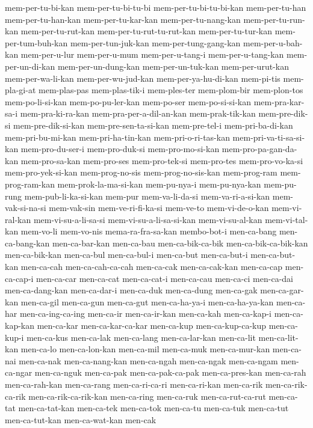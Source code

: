 {mem-per-tu-bi-kan mem-per-tu-bi-tu-bi mem-per-tu-bi-tu-bi-kan
mem-per-tu-han mem-per-tu-han-kan mem-per-tu-kar-kan mem-per-tu-nang-kan
mem-per-tu-run-kan mem-per-tu-rut-kan mem-per-tu-rut-tu-rut-kan
mem-per-tu-tur-kan mem-per-tum-buh-kan mem-per-tun-juk-kan
mem-per-tung-gang-kan mem-per-u-bah-kan mem-per-u-lur mem-per-u-mum
mem-per-u-tang-i mem-per-u-tang-kan mem-per-un-di-kan mem-per-un-dung-kan
mem-per-un-tuk-kan mem-per-urut-kan mem-per-wa-li-kan mem-per-wu-jud-kan
mem-per-ya-hu-di-kan mem-pi-tis mem-pla-gi-at mem-plas-pas mem-plas-tik-i
mem-ples-ter mem-plom-bir mem-plon-tos mem-po-li-si-kan mem-po-pu-ler-kan
mem-po-ser mem-po-si-si-kan mem-pra-kar-sa-i mem-pra-ki-ra-kan
mem-pra-per-a-dil-an-kan mem-prak-tik-kan mem-pre-dik-si
mem-pre-dik-si-kan mem-pre-sen-ta-si-kan mem-pre-tel-i mem-pri-ba-di-kan
mem-pri-bu-mi-kan mem-pri-ha-tin-kan mem-pri-o-ri-tas-kan
mem-pri-va-ti-sa-si-kan mem-pro-du-ser-i mem-pro-duk-si mem-pro-mo-si-kan
mem-pro-pa-gan-da-kan mem-pro-sa-kan mem-pro-ses mem-pro-tek-si
mem-pro-tes mem-pro-vo-ka-si mem-pro-yek-si-kan mem-prog-no-sis
mem-prog-no-sis-kan mem-prog-ram mem-prog-ram-kan mem-prok-la-ma-si-kan
mem-pu-nya-i mem-pu-nya-kan mem-pu-rung mem-pub-li-ka-si-kan mem-pur
mem-va-li-da-si mem-va-ri-a-si-kan mem-vak-si-na-si mem-vak-sin
mem-ve-ri-fi-ka-si mem-ve-to mem-vi-de-o-kan mem-vi-ral-kan
mem-vi-su-a-li-sa-si mem-vi-su-a-li-sa-si-kan mem-vi-su-al-kan
mem-vi-tal-kan mem-vo-li mem-vo-nis mema-ra-fra-sa-kan membo-bot-i
men-ca-bang men-ca-bang-kan men-ca-bar-kan men-ca-bau men-ca-bik-ca-bik
men-ca-bik-ca-bik-kan men-ca-bik-kan men-ca-bul men-ca-bul-i men-ca-but
men-ca-but-i men-ca-but-kan men-ca-cah men-ca-cah-ca-cah men-ca-cak
men-ca-cak-kan men-ca-cap men-ca-cap-i men-ca-car men-ca-cat men-ca-cat-i
men-ca-cau men-ca-ci men-ca-dai men-ca-dang-kan men-ca-dar-i men-ca-duk
men-ca-dung men-ca-gak men-ca-gar-kan men-ca-gil men-ca-gun men-ca-gut
men-ca-ha-ya-i men-ca-ha-ya-kan men-ca-har men-ca-ing-ca-ing men-ca-ir
men-ca-ir-kan men-ca-kah men-ca-kap-i men-ca-kap-kan men-ca-kar
men-ca-kar-ca-kar men-ca-kup men-ca-kup-ca-kup men-ca-kup-i men-ca-kus
men-ca-lak men-ca-lang men-ca-lar-kan men-ca-lit men-ca-lit-kan men-ca-lo
men-ca-lon-kan men-ca-mil men-ca-muk men-ca-mur-kan men-ca-nai men-ca-nak
men-ca-nang-kan men-ca-ngah men-ca-ngak men-ca-ngam men-ca-ngar
men-ca-nguk men-ca-pak men-ca-pak-ca-pak men-ca-pres-kan men-ca-rah
men-ca-rah-kan men-ca-rang men-ca-ri-ca-ri men-ca-ri-kan men-ca-rik
men-ca-rik-ca-rik men-ca-rik-ca-rik-kan men-ca-ring men-ca-ruk
men-ca-rut-ca-rut men-ca-tat men-ca-tat-kan men-ca-tek men-ca-tok
men-ca-tu men-ca-tuk men-ca-tut men-ca-tut-kan men-ca-wat-kan men-cak
}
